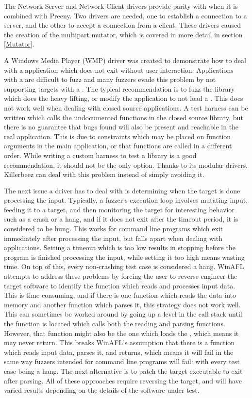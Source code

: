The Network Server and Network Client drivers provide parity with \AFL{} when it
is combined with Preeny.\cite{preeny}  Two drivers are needed, one to establish
a connection to a server, and the other to accept a connection from a
client. These drivers caused the creation of the multipart mutator,
which is covered in more detail in section \ref{Mutator}.

A Windows Media Player (WMP) driver was created to demonstrate how to deal with
a \GUI{} application which does not exit without user interaction. Applications
with a \GUI{} are difficult to fuzz and many fuzzers evade this problem by not
supporting targets with a \GUI{}.  The typical recommendation is to fuzz the library
which does the heavy lifting, or modify the application to not load a \GUI{}.
This does not work well when dealing with closed source applications. A test
harness can be written which calls the undocumented functions in the closed
source library, but there is no guarantee that bugs found will also be present
and reachable in the real application.  This is due to constraints which may
be placed on function arguments in the main application, or that functions are
called in a different order.  While writing a custom harness to test a library
is a good recommendation, it should not be the only option. Thanks to its
modular drivers, Killerbeez can deal with this problem instead of simply avoiding it.

The next issue a driver has to deal with is determining when the target is done
processing the input.
Typically, a fuzzer's execution loop involves mutating input, feeding it to a
target, and then monitoring the target for interesting behavior such as a crash
or a hang, and if it does not exit after the timeout period, it is considered to
be hung.  This works for command line programs which exit immediately after processing
the input, but falls apart when dealing with \GUI{} applications.
Setting a timeout which is too low results in stopping before the
program is finished processing the input, while setting it too high means
wasting time. On top of this, every non-crashing test case is considered
a hang. WinAFL attempts to address these problems by forcing the user to
reverse engineer the target software to identify the function which reads and
processes input data.  This is time consuming, and if there is one function
which reads the data into memory and another function which parses it, this
strategy does not work well. This can sometimes be worked around by going up
a level in the call stack until the function is located which calls both the reading and parsing functions.
However, that function might also be the one which loads the \GUI{}, which means
it may never return. This breaks WinAFL's assumption that there is a function
which reads input data, parses it, and returns, which means it will fail in the
same way fuzzers intended for command line programs will fail: with every test
case being a hang.  The next alternative is to patch the target executable
to exit after parsing. All of these approaches require reversing the target,
and will have varied results depending on the details of the software under test.

